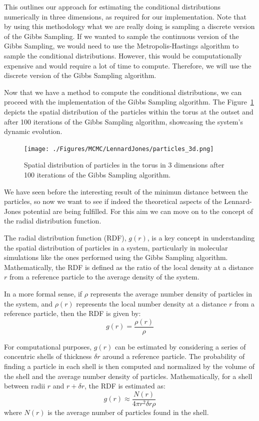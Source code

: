 \documentclass{report}
\begin{document}
This outlines our approach for estimating the conditional distributions numerically in three dimensions, as required for our implementation. Note that by using this methodology what we are really doing is sampling a discrete version of the Gibbs Sampling. If we wanted to sample the continuous version of the Gibbs Sampling, we would need to use the Metropolis-Hastings algorithm to sample the conditional distributions. However, this would be computationally expensive and would require a lot of time to compute. Therefore, we will use the discrete version of the Gibbs Sampling algorithm.

Now that we have a method to compute the conditional distributions, we can proceed with the implementation of the Gibbs Sampling algorithm. The Figure~\ref{fig:particlesmh2} depicts the spatial distribution of the particles within the torus at the outset and after 100 iterations of the Gibbs Sampling algorithm, showcasing the system's dynamic evolution.

\begin{figure}[H]
	\centering
	\texttt{[image: ./Figures/MCMC/LennardJones/particles\_3d.png]}
	\caption{Spatial distribution of particles in the torus in 3 dimensions after 100 iterations of the Gibbs Sampling algorithm.}
	\label{fig:particlesmh2}
\end{figure}

We have seen before the interesting result of the minimun distance between the particles, so now we want to see if indeed the theoretical aspects of the Lennard-Jones potential are being fulfilled. For this aim we can move on to the concept of the radial distribution function. 

The radial distribution function (RDF), \( g(r) \), is a key concept in understanding the spatial distribution of particles in a system, particularly in molecular simulations like the ones performed using the Gibbs Sampling algorithm. Mathematically, the RDF is defined as the ratio of the local density at a distance \( r \) from a reference particle to the average density of the system. 

In a more formal sense, if \( \rho \) represents the average number density of particles in the system, and \( \rho(r) \) represents the local number density at a distance \( r \) from a reference particle, then the RDF is given by:
\[ g(r) = \frac{\rho(r)}{\rho} \]

For computational purposes, \( g(r) \) can be estimated by considering a series of concentric shells of thickness \( \delta r \) around a reference particle. The probability of finding a particle in each shell is then computed and normalized by the volume of the shell and the average number density of particles. Mathematically, for a shell between radii \( r \) and \( r + \delta r \), the RDF is estimated as:
\[ g(r) \approx \frac{N(r)}{4\pi r^2 \delta r \rho} \]
where \( N(r) \) is the average number of particles found in the shell.
\end{document}
